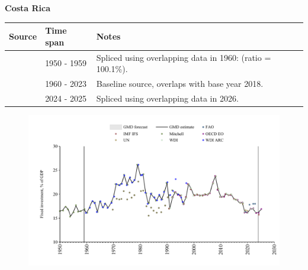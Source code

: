 \documentclass[12pt,a4paper,landscape]{article}
\begin{document}
\begin{adjustbox}{max totalsize={\paperwidth}{\paperheight},center}
\begin{minipage}[t][\textheight][t]{\textwidth}
\vspace*{0.5cm}
{}
\begin{center}
{\Large\bfseries Costa Rica}
\end{center}
\vspace{0.5cm}
\begin{table}[H]
\centering
\small
\begin{tabular}{|l|l|l|}
\hline
\textbf{Source} & \textbf{Time span} & \textbf{Notes} \\
\hline
\rowcolor{white}\cite{Mitchell}& 1950 - 1959 &Spliced using overlapping data in 1960: (ratio = 100.1\%).\\
\rowcolor{lightgray}\cite{WDI}& 1960 - 2023 &Baseline source, overlaps with base year 2018.\\
\rowcolor{white}\cite{OECD_EO}& 2024 - 2025 &Spliced using overlapping data in 2026.\\
\hline
\end{tabular}
\end{table}
\begin{figure}[H]
\centering
\includegraphics[width=\textwidth,height=0.6\textheight,keepaspectratio]{graphs/CRI_finv_GDP.pdf}
\end{figure}
\end{minipage}
\end{adjustbox}
\end{document}
